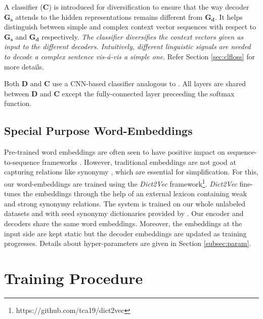 \documentclass[11pt,a4paper]{article}
\begin{document}
A classifier ($\boldsymbol{C}$) is introduced for diversification to ensure that the way decoder $\boldsymbol{G_s}$ attends to the hidden representations remains different from $\boldsymbol{G_d}$. It helps distinguish between simple and complex context vector sequences with respect to  $\boldsymbol{G_s}$ and $\boldsymbol{G_d}$ respectively. \emph{The classifier  diversifies the context vectors given as input to the different decoders. Intuitively, different linguistic signals are needed to decode a complex sentence \textit{vis-\'a-vis} a simple one}. Refer Section \ref{sec:clfloss} for more details. 

Both  $\boldsymbol{D}$ and $\boldsymbol{C}$ use a CNN-based classifier analogous to . All layers are shared between $\boldsymbol{D}$ and $\boldsymbol{C}$ except the fully-connected layer preceeding the softmax function.

\subsection{Special Purpose Word-Embeddings}
Pre-trained word embeddings are often seen to have positive impact on  sequence-to-sequence frameworks \cite{cho2014properties,qi2018and}. However, traditional embeddings are not good at capturing relations like synonymy \cite{tissier2017dict2vec}, which are essential for simplification. For this, our word-embeddings are trained using the \textit{Dict2Vec} framework\footnote{https://github.com/tca19/dict2vec}. \textit{Dict2Vec} fine-tunes the embeddings through the help of an external lexicon containing weak and strong synonymy relations. The system is trained on our whole unlabeled datasets and with seed synonymy dictionaries provided by . Our encoder and decoders share the same word embeddings. Moreover, the embeddings at the input side are kept static but the decoder embeddings are updated as training progresses. Details about hyper-parameters are given in Section \ref{subsec:param}.

 \section{Training Procedure}
\label{sec:training}

\def\xs {$\boldsymbol{X_s}$}
\def\xd {$\boldsymbol{X_d}$}
\def\S {$\boldsymbol{\mathcal{S}}$}
\def\Sh {$\boldsymbol{\mathcal{S}_h}$}
\def\D {$\boldsymbol{\mathcal{D}}$} 
\def\Dh {$\boldsymbol{\mathcal{D}_h}$}
\def\belongsto {$\in$}
\def\Enc {$\boldsymbol{E}$}
\def\G {$\boldsymbol{G}$}
\def\Ds {$\boldsymbol{D_s}$}
\def\Dd {$\boldsymbol{D_d}$}
\def\C {$\boldsymbol{C}$}
\def\thetaE{\boldsymbol{\theta_E}}
\def\thetaG{\boldsymbol{\theta_G}}
\def\thetaGs{\boldsymbol{\theta_{G_s}}}
\def\thetaGd{\boldsymbol{\theta_{G_d}}}
\def\thetaDs{\boldsymbol{\theta_{D_s}}}
\def\thetaC{\boldsymbol{\theta_{C}}}
\def\thetaD{\boldsymbol{\theta_{D}}}
\def\thetaDd{\boldsymbol{\theta_{D_d}}}
\def\simplf{$\boldsymbol{E-G_s}$}
\def\simplfm{\boldsymbol{E-G_s}}
\def\pipe{\boldsymbol{E-G}}
\def\fpipe{\boldsymbol{E-G}}
\def\compl{$\boldsymbol{E-G_d}$}
\def\complm{\boldsymbol{E-G_d}}
\def\Lrec{\mathcal{L_rec}}
\end{document}
